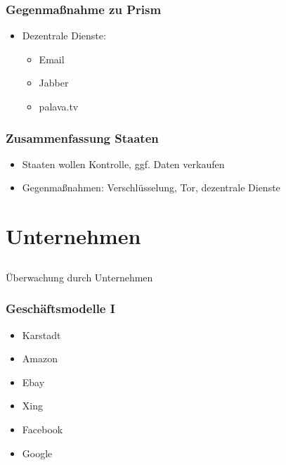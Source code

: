 \documentclass[12pt]{beamer}
\begin{document}
\begin{frame}
  \frametitle{Gegenmaßnahme zu Prism}
  \begin{itemize}
    \item<2-> Dezentrale Dienste:
      \begin{itemize}
        \item<3-> Email
        \item<4-> Jabber
        \item<5-> palava.tv
      \end{itemize}
  \end{itemize}
\end{frame}

\begin{frame}
  \frametitle{Zusammenfassung Staaten}
  \begin{itemize}
    \item Staaten wollen Kontrolle, ggf. Daten verkaufen
    \item Gegenmaßnahmen: Verschlüsselung, Tor, dezentrale Dienste
  \end{itemize}
\end{frame}

\section{Unternehmen}
\subsection{}

\begin{frame}
  \begin{center}\Large
    Überwachung durch Unternehmen
  \end{center}
\end{frame}

\begin{frame}
    \frametitle{Geschäftsmodelle I}
    \begin{itemize}
        \item<2-> Karstadt
        \item<3-> Amazon
        \item<4-> Ebay
        \item<5-> Xing
        \item<6-> Facebook
        \item<6-> Google
    \end{itemize}
\end{frame}
\end{document}
